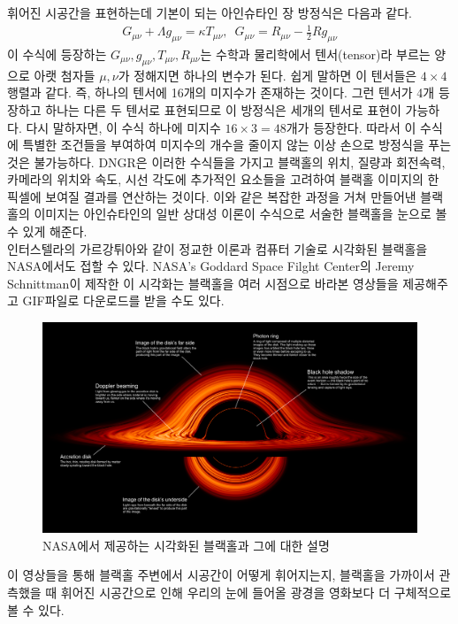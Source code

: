 \documentclass[
    aps,
    reprint,
    superscriptaddress,
    ]{revtex4-2}
\begin{document}
휘어진 시공간을 표현하는데 기본이 되는 아인슈타인 장 방정식은 다음과 같다.
\begin{align}
  G_{\mu\nu} + \Lambda g_{\mu\nu} = \kappa T_{\mu\nu},\,\,\,
  G_{\mu\nu} = R_{\mu\nu} -\frac{1}{2}Rg_{\mu\nu}
\end{align}
이 수식에 등장하는 $G_{\mu\nu},g_{\mu\nu},T_{\mu\nu},R_{\mu\nu}$는 수학과 물리학에서 
텐서(tensor)라 부르는 양으로 아랫 첨자들 $\mu, \nu$가 정해지면 하나의 변수가 된다. 쉽게 말하면
이 텐서들은 $4\times 4$ 행렬과 같다. 즉, 하나의 텐서에 16개의 미지수가 존재하는 것이다.
그런 텐서가 4개 등장하고 하나는 다른 두 텐서로 표현되므로 이 방정식은 세개의 텐서로 표현이 가능하다.
다시 말하자면, 이 수식 하나에 미지수 $16\times 3 = 48$개가 등장한다. 따라서 이 수식에 특별한 
조건들을 부여하여 미지수의 개수을 줄이지 않는 이상 손으로 방정식을 푸는 것은 불가능하다. 
DNGR은 이러한 수식들을 가지고 블랙홀의 위치, 질량과 회전속력, 카메라의 위치와 속도, 시선 각도에 
추가적인 요소들을 고려하여 블랙홀 이미지의 한 픽셀에 보여질 결과를 연산하는 것이다. 
이와 같은 복잡한 과정을 거쳐 만들어낸 블랙홀의 이미지는 아인슈타인의 일반 상대성 이론이 
수식으로 서술한 블랙홀을 눈으로 볼 수 있게 해준다. \\
인터스텔라의 가르강튀아와 같이 정교한 이론과 컴퓨터 기술로 시각화된 블랙홀을 NASA에서도 접할 수 
있다. NASA's Goddard Space Filght Center의 Jeremy Schnittman이 제작한 이 시각화는 
블랙홀을 여러 시점으로 바라본 영상들을 제공해주고 GIF파일로 다운로드를 받을 수도 있다.
\begin{figure}[h]
  \includegraphics[scale=0.08]{nasa.jpg}
  \caption{NASA에서 제공하는 시각화된 블랙홀과 그에 대한 설명}
  \label{fig:6}
\end{figure}
이 영상들을 통해 블랙홀 주변에서 시공간이 어떻게 휘어지는지, 블랙홀을 가까이서 관측했을 때 
휘어진 시공간으로 인해 우리의 눈에 들어올 광경을 영화보다 더 구체적으로 볼 수 있다.
\end{document}
